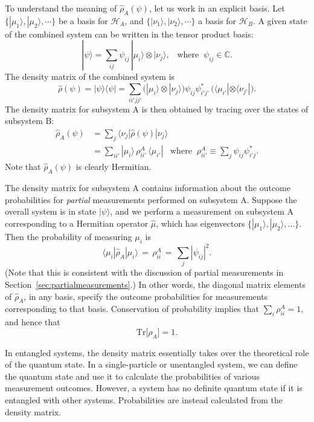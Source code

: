 \documentclass[pra,11pt]{revtex4}
\begin{document}
To understand the meaning of $\hat{\rho}_A(\psi)$, let us work in
an explicit basis.  Let $\{|\mu_1\rangle, |\mu_2\rangle,\cdots\}$ be a
basis for $\mathscr{H}_A$, and $\{|\nu_1\rangle,
|\nu_2\rangle,\cdots\}$ a basis for $\mathscr{H}_B$.  A given state of
the combined system can be written in the tensor product basis:
$$|\psi\rangle = \sum_{ij} \psi_{ij} \, |\mu_i\rangle \otimes |\nu_j\rangle, \;\;\; \mathrm{where}\;\; \psi_{ij} \in \mathbb{C}.$$
The density matrix of the combined system is
$$\hat{\rho}(\psi) = |\psi\rangle \langle\psi| = \sum_{ii'jj'} \Big( |\mu_i\rangle \otimes |\nu_j\rangle\Big) \psi_{ij} \psi_{i'j'}^* \, \Big(\langle \mu_{i'}| \otimes \langle \nu_{j'}|\Big).$$
The density matrix for subsystem A is then obtained by tracing over
the states of subsystem B:
$$\begin{aligned}\hat{\rho}_A(\psi) &= \sum_j \langle \nu_j | \hat{\rho}(\psi) | \nu_j \rangle \\ &= \sum_{ii'} |\mu_i\rangle \,\rho_{ii'}^A \, \langle \mu_{i'}| \;\;\;\mathrm{where} \;\; \rho_{ii'}^A \equiv \sum_j \psi_{ij} \psi_{i'j}^*.\end{aligned}$$
Note that $\hat{\rho}_A(\psi)$ is clearly Hermitian.

The density matrix for subsystem A contains information about the
outcome probabilities for \textit{partial} measurements performed on
subsystem A.  Suppose the overall system is in state $|\psi\rangle$,
and we perform a measurement on subsystem A corresponding to a
Hermitian operator $\hat{\mu}$, which has eigenvectors
$\{|\mu_1\rangle,|\mu_2\rangle,\dots\}$.  Then the probability of
measuring $\mu_i$ is
$$\langle \mu_i | \hat{\rho}_A |\mu_i \rangle \,=\, \rho_{ii}^A \,=\, \sum_{j} |\psi_{ij}|^2.$$
(Note that this is consistent with the discussion of partial
measurements in Section~\ref{sec:partialmeasurements}.)  In other
words, the diagonal matrix elements of $\hat{\rho}_A$, in any basis,
specify the outcome probabilities for measurements corresponding to
that basis.  Conservation of probability implies that $\sum_i
\rho^A_{ii} = 1$, and hence that
$$\mathrm{Tr}\big[\rho_A\big] = 1.$$

In entangled systems, the density matrix essentially takes over the
theoretical role of the quantum state.  In a single-particle or
unentangled system, we can define the quantum state and use it to
calculate the probabilities of various measurement outcomes.  However,
a system has no definite quantum state if it is entangled with other
systems.  Probabilities are instead calculated from the density
matrix.
\end{document}
